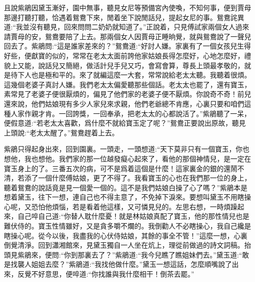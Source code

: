 \begin{parag}
    且說紫鵑因黛玉漸好，園中無事，聽見女尼等預備宮內使喚，不知何事，便到賈母那邊打聽打聽，恰遇着鴛鴦下來，閒着坐下說閒話兒，提起女尼的事。鴛鴦詫異道:“我並沒有聽見，回來問問二奶奶就知道了。”正說着，只見傅試家兩個女人過來請賈母的安，鴛鴦要陪了上去。那兩個女人因賈母正睡晌覺，就與鴛鴦說了一聲兒回去了。紫鵑問:“這是誰家差來的？”鴛鴦道:“好討人嫌。家裏有了一個女孩兒生得好些，便獻寶的似的，常常在老太太面前誇他家姑娘長得怎麼好，心地怎麼好，禮貌上又能，說話兒又簡絕，做活計兒手兒又巧，會寫會算，尊長上頭最孝敬的，就是待下人也是極和平的。來了就編這麼一大套，常常說給老太太聽。我聽着很煩。這幾個老婆子真討人嫌。我們老太太偏愛聽那些個話。老太太也罷了，還有寶玉，素常見了老婆子便很厭煩的，偏見了他們家的老婆子便不厭煩。你說奇不奇！前兒還來說，他們姑娘現有多少人家兒來求親，他們老爺總不肯應，心裏只要和咱們這種人家作親才肯。一回誇獎，一回奉承，把老太太的心都說活了。”紫鵑聽了一呆，便假意道:“若老太太喜歡，爲什麼不就給寶玉定了呢？”鴛鴦正要說出原故，聽見上頭說:“老太太醒了。”鴛鴦趕着上去。
\end{parag}


\begin{parag}
    紫鵑只得起身出來，回到園裏。一頭走，一頭想道:“天下莫非只有一個寶玉，你也想他，我也想他。我們家的那一位越發癡心起來了，看他的那個神情兒，是一定在寶玉身上的了。三番五次的病，可不是爲着這個是什麼！這家裏金的銀的還鬧不清，若添了一個什麼傅姑娘，更了不得了。我看寶玉的心也在我們那一位的身上，聽着鴛鴦的說話竟是見一個愛一個的。這不是我們姑娘白操了心了嗎？”紫鵑本是想着黛玉，往下一想，連自己也不得主意了，不免掉下淚來。要想叫黛玉不用瞎操心呢，又恐怕他煩惱，若是看着他這樣，又可憐見兒的。左思右想，一時煩躁起來，自己啐自己道:“你替人耽什麼憂！就是林姑娘真配了寶玉，他的那性情兒也是難伏侍的。寶玉性情雖好，又是貪多嚼不爛的。我倒勸人不必瞎操心，我自己纔是瞎操心呢。從今以後，我盡我的心伏侍姑娘，其餘的事全不管！”這麼一想，心裏倒覺清淨。回到瀟湘館來，見黛玉獨自一人坐在炕上，理從前做過的詩文詞稿。抬頭見紫鵑來，便問:“你到那裏去了？”紫鵑道:“我今兒瞧了瞧姐妹們去。”黛玉道:“敢是找襲人姐姐去麼？”紫鵑道:“我找他做什麼。”黛玉一想這話，怎麼順嘴說了出來，反覺不好意思，便啐道:“你找誰與我什麼相干！倒茶去罷。”
\end{parag}


